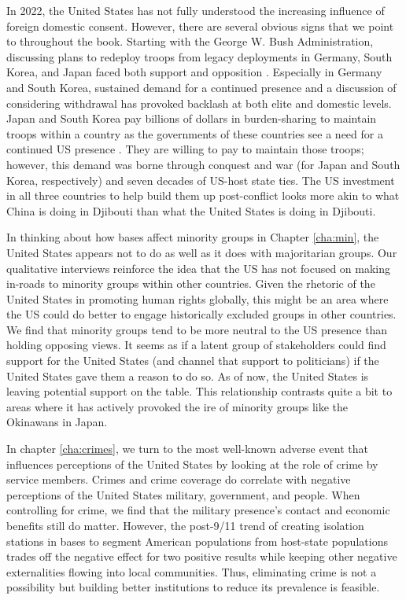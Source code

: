 In 2022, the United States has not fully understood the increasing influence of foreign domestic consent. However, there are several obvious signs that we point to throughout the book. Starting with the George W. Bush Administration, discussing plans to redeploy troops from legacy deployments in Germany, South Korea, and Japan faced both support and opposition \cite{Sang-Hun2006,Sang-Hun2018,AssociatedPress2020}. Especially in Germany and South Korea, sustained demand for a continued presence and a discussion of considering withdrawal has provoked backlash at both elite and domestic levels. Japan and South Korea pay billions of dollars in burden-sharing to maintain troops within a country as the governments of these countries see a need for a continued US presence \cite{Flynn2019}. They are willing to pay to maintain those troops; however, this demand was borne through conquest and war (for Japan and South Korea, respectively) and seven decades of US-host state ties. The US investment in all three countries to help build them up post-conflict looks more akin to what China is doing in Djibouti than what the United States is doing in Djibouti.


In thinking about how bases affect minority groups in Chapter \ref{cha:min}, the United States appears not to do as well as it does with majoritarian groups. Our qualitative interviews reinforce the idea that the US has not focused on making in-roads to minority groups within other countries. Given the rhetoric of the United States in promoting human rights globally, this might be an area where the US could do better to engage historically excluded groups in other countries. We find that minority groups tend to be more neutral to the US presence than holding opposing views. It seems as if a latent group of stakeholders could find support for the United States (and channel that support to politicians) if the United States gave them a reason to do so. As of now, the United States is leaving potential support on the table. This relationship contrasts quite a bit to areas where it has actively provoked the ire of minority groups like the Okinawans in Japan.

In chapter \ref{cha:crimes}, we turn to the most well-known adverse event that influences perceptions of the United States by looking at the role of crime by service members. Crimes and crime coverage do correlate with negative perceptions of the United States military, government, and people. When controlling for crime, we find that the military presence's contact and economic benefits still do matter. However, the post-9/11 trend of creating isolation stations in bases to segment American populations from host-state populations trades off the negative effect for two positive results while keeping other negative externalities flowing into local communities. Thus, eliminating crime is not a possibility but building better institutions to reduce its prevalence is feasible. 

